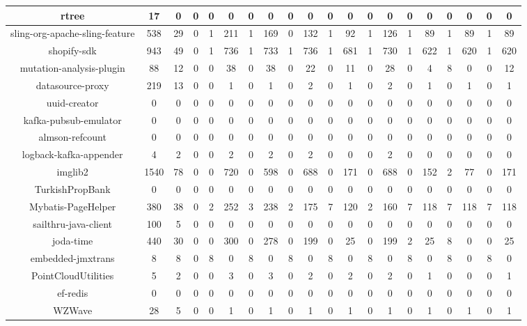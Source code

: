 \begin{table}
\begin{tabular}{|c|c|c|c|c|c|c|c|c|c|c|c|c|c|c|c|c|c|c|c|}
\hline
rtree & 17 & 0 & 0 & 0 & 0 & 0 & 0 & 0 & 0 & 0 & 0 & 0 & 0 & 0 & 0 & 0 & 0 & 0 & 0 \\
\hline
sling-org-apache-sling-feature & 538 & 29 & 0 & 1 & 211 & 1 & 169 & 0 & 132 & 1 & 92 & 1 & 126 & 1 & 89 & 1 & 89 & 1 & 89 \\
\hline
shopify-sdk & 943 & 49 & 0 & 1 & 736 & 1 & 733 & 1 & 736 & 1 & 681 & 1 & 730 & 1 & 622 & 1 & 620 & 1 & 620 \\
\hline
mutation-analysis-plugin & 88 & 12 & 0 & 0 & 38 & 0 & 38 & 0 & 22 & 0 & 11 & 0 & 28 & 0 & 4 & 8 & 0 & 0 & 12 \\
\hline
datasource-proxy & 219 & 13 & 0 & 0 & 1 & 0 & 1 & 0 & 2 & 0 & 1 & 0 & 2 & 0 & 1 & 0 & 1 & 0 & 1 \\
\hline
uuid-creator & 0 & 0 & 0 & 0 & 0 & 0 & 0 & 0 & 0 & 0 & 0 & 0 & 0 & 0 & 0 & 0 & 0 & 0 & 0 \\
\hline
kafka-pubsub-emulator & 0 & 0 & 0 & 0 & 0 & 0 & 0 & 0 & 0 & 0 & 0 & 0 & 0 & 0 & 0 & 0 & 0 & 0 & 0 \\
\hline
almson-refcount & 0 & 0 & 0 & 0 & 0 & 0 & 0 & 0 & 0 & 0 & 0 & 0 & 0 & 0 & 0 & 0 & 0 & 0 & 0 \\
\hline
logback-kafka-appender & 4 & 2 & 0 & 0 & 2 & 0 & 2 & 0 & 2 & 0 & 0 & 0 & 2 & 0 & 0 & 0 & 0 & 0 & 0 \\
\hline
imglib2 & 1540 & 78 & 0 & 0 & 720 & 0 & 598 & 0 & 688 & 0 & 171 & 0 & 688 & 0 & 152 & 2 & 77 & 0 & 171 \\
\hline
TurkishPropBank & 0 & 0 & 0 & 0 & 0 & 0 & 0 & 0 & 0 & 0 & 0 & 0 & 0 & 0 & 0 & 0 & 0 & 0 & 0 \\
\hline
Mybatis-PageHelper & 380 & 38 & 0 & 2 & 252 & 3 & 238 & 2 & 175 & 7 & 120 & 2 & 160 & 7 & 118 & 7 & 118 & 7 & 118 \\
\hline
sailthru-java-client & 100 & 5 & 0 & 0 & 0 & 0 & 0 & 0 & 0 & 0 & 0 & 0 & 0 & 0 & 0 & 0 & 0 & 0 & 0 \\
\hline
joda-time & 440 & 30 & 0 & 0 & 300 & 0 & 278 & 0 & 199 & 0 & 25 & 0 & 199 & 2 & 25 & 8 & 0 & 0 & 25 \\
\hline
embedded-jmxtrans & 8 & 8 & 0 & 8 & 0 & 8 & 0 & 8 & 0 & 8 & 0 & 8 & 0 & 8 & 0 & 8 & 0 & 8 & 0 \\
\hline
PointCloudUtilities & 5 & 2 & 0 & 0 & 3 & 0 & 3 & 0 & 2 & 0 & 2 & 0 & 2 & 0 & 1 & 0 & 0 & 0 & 1 \\
\hline
ef-redis & 0 & 0 & 0 & 0 & 0 & 0 & 0 & 0 & 0 & 0 & 0 & 0 & 0 & 0 & 0 & 0 & 0 & 0 & 0 \\
\hline
WZWave & 28 & 5 & 0 & 0 & 1 & 0 & 1 & 0 & 1 & 0 & 1 & 0 & 1 & 0 & 1 & 0 & 1 & 0 & 1 \\

\end{tabular}
\end{table}
